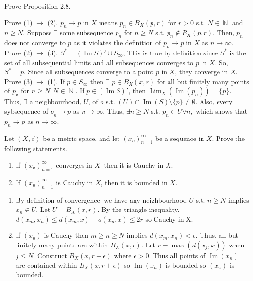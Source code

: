 \documentclass[12pt,letterpaper,boxed]{hmcpset}
\DeclareMathOperator{\Lim}{Lim}
\DeclareMathOperator{\Img}{Im}
\DeclareMathOperator{\N}{\mathbb{N}}
\begin{document}
\begin{problem}[Exercise 2.9]
Prove Proposition 2.8.
\end{problem}

\begin{solution}
Prove (1) $\rightarrow$ (2). $p_n\rightarrow p$ in $X$ means $p_n \in B_X(p, r)$ for $r > 0$ s.t. $N\in\N$ and $n \ge N.$ Suppose $\exists$ some subsequence $p_n$ for $n \ge N$ s.t. $p_n \notin B_X(p, r)$. Then, $p_n$ does not converge to $p$ as it violates the definition of $p_n\rightarrow p$ in $X$ as $n\rightarrow \infty$. Prove (2) $\rightarrow$ (3). $S^{*}=(\Img S)' \cup S_{\infty}$, This is true by definition since $S^{*}$ is the set of all subsequential limits and all subsequences converges to $p$ in $X$. So, $S^{*}=p.$ Since all subsequences converge to a point $p$ in $X$, they converge in $X.$ Prove (3) $\rightarrow$ (1). If $p\in S_\infty$ then $\exists$ $p \in B_X(x,r)$ for all but finitely many points of $p_n$ for $n \ge N, N \in \N.$ If $p \in (\Img S)'$, then $\Lim_X(\Img(p_n))= \{p\}.$ Thus, $\exists$ a neighbourhood, $U$, of $p$ s.t. $(U)\cap \Img(S)\setminus\{p\}\neq\emptyset$. Also, every sybsequence of $p_n \rightarrow p$ as $n \rightarrow \infty.$ Thus, $\exists n \ge N$ s.t. $p_n \in U \forall n,$ which shows that $p_n \rightarrow p$ as $n\rightarrow \infty.$ 
\end{solution}


\begin{problem}[Exercise 2.16]
Let $(X, d)$ be a metric space, and let $(x_n)_{n=1}^{\infty}$ be a sequence in $X$. Prove the following statements.
\vspace{-2mm}
	\begin{enumerate}
		\itemsep0em
		\item If $(x_n)_{n=1}^{\infty}$ converges in $X$, then it is Cauchy in $X$.
		\item If $(x_n)_{n=1}^{\infty}$ is Cauchy in $X$, then it is bounded in $X$.
	\end{enumerate}
\end{problem}

\begin{solution}
\vspace{-1mm}
	\begin{enumerate}
		\itemsep0em
		\item By definition of convergence, we have any neighbourhood $U$ s.t. $n \ge N$ implies $x_n \in U$. Let $U=B_X(x, r)$. By the triangle inequality. $d(x_m, x_n) \leq d(x_m,x) + d(x_n, x) \leq 2r$ so Cauchy in X.
		\item If $(x_n)$ is Cauchy then $m \ge n \ge N$ implies $d(x_m, x_n) < \epsilon$. Thus, all but finitely many points are within $B_X(x, \epsilon)$. Let $r=\max(d(x_j, x))$ when $j \leq N.$ Construct $B_X(x, r + \epsilon)$ where $\epsilon > 0$. Thus all points of $\Img(x_n)$ are contained within $B_X(x, r + \epsilon)$ so $\Img(x_n)$ is bounded so $(x_n)$ is bounded.
	\end{enumerate}
\end{solution}
\end{document}
